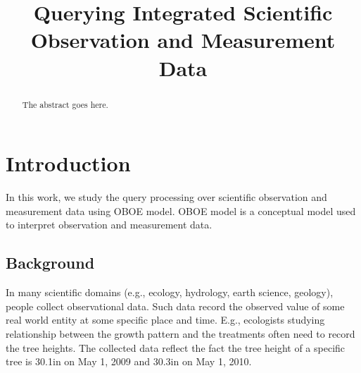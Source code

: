 \documentclass[conference]{IEEEtran}
\begin{document}
\title{Querying Integrated Scientific Observation and Measurement Data}

\author{
\and
{}
\and
{}
}

\maketitle


\begin{abstract}
The abstract goes here.
\end{abstract}


\section{Introduction}\label{sec:intro}
In this work, we study the query processing over scientific
observation and measurement data using OBOE
model\cite{DBLP:conf/er/BowersMS08}. OBOE model is a conceptual model
used to interpret observation and measurement data. 

\subsection{Background}

In many scientific domains (e.g., ecology, hydrology, earth science,
geology), people collect observational data. Such data
record the observed value of some real world entity at some specific
place and time. E.g., ecologists studying relationship between the 
growth pattern and the treatments often need to record the tree
heights. The collected data reflect the fact the tree height of a
specific tree is 30.1in on May 1, 2009 and 30.3in on May 1, 2010. 
\end{document}
